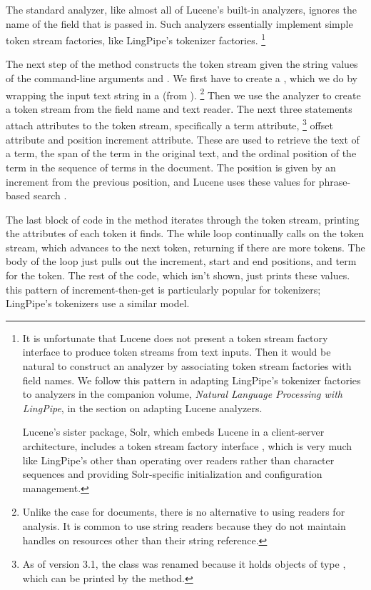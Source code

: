 The standard analyzer, like almost all of Lucene's built-in analyzers,
ignores the name of the field that is passed in.  Such analyzers
essentially implement simple token stream factories, like LingPipe's
tokenizer factories.%
%
\footnote{It is unfortunate that Lucene does not present a token
  stream factory interface to produce token streams from text inputs.
  Then it would be natural to construct an analyzer by associating
  token stream factories with field names.  We follow this pattern in
  adapting LingPipe's tokenizer factories to analyzers in the companion
  volume, {\it Natural Language Processing with LingPipe}, in the
  section on adapting Lucene analyzers.

Lucene's sister package, Solr, which embeds Lucene in a client-server
architecture, includes a token stream factory interface
, which is very much like LingPipe's other than
operating over readers rather than character sequences and providing
Solr-specific initialization and configuration management.}


The next step of the  method constructs the token stream
given the string values of the command-line arguments 
and .  
%
%
We first have to create a , which we do by wrapping the
input text string in a  (from ).%
%
\footnote{Unlike the case for documents, there is no alternative to
  using readers for analysis.  It is common to use string readers
  because they do not maintain handles on resources other than their
  string reference.}
%
Then we use the analyzer to create a token stream from the field name
and text reader.  The next three statements attach attributes to the
token stream, specifically a term attribute,%
%
\footnote{As of version 3.1, the  class was
  renamed  because it holds objects of type
 , which can be printed by the 
  method.}
%
offset attribute and
position increment attribute.  These are used to retrieve the text of
a term, the span of the term in the original text, and the ordinal
position of the term in the sequence of terms in the document.  The
position is given by an increment from the previous position, and
Lucene uses these values for phrase-based search .

The last block of code in the  method iterates through
the token stream, printing the attributes of each token it finds.
%
%
The while loop continually calls  on the token
stream, which advances to the next token, returning  if
there are more tokens.  The body of the loop just pulls out the
increment, start and end positions, and term for the token.  The rest
of the code, which isn't shown, just prints these values.  this
pattern of increment-then-get is particularly popular for tokenizers;
LingPipe's tokenizers use a similar model.  


